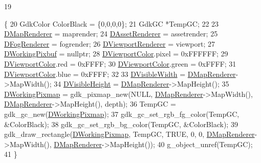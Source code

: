 \begin{DoxyCode}
19                                                                                                            
                                                                                                                  
       \{
20     GdkColor ColorBlack = \{0,0,0,0\};
21     GdkGC *TempGC;
22     
23     \hyperlink{classCMiniMapRenderer_a6656b208c6b29641a151ea4cbcfda31b}{DMapRenderer} = maprender;
24     \hyperlink{classCMiniMapRenderer_a352998f61c6777ccb3969712b8e691d9}{DAssetRenderer} = assetrender;
25     \hyperlink{classCMiniMapRenderer_a51a715ce4773d3fa3f433a282632035c}{DFogRenderer} = fogrender;
26     \hyperlink{classCMiniMapRenderer_a36d2e3446baba2607129c673311d3420}{DViewportRenderer} = viewport;
27     \hyperlink{classCMiniMapRenderer_ad5f723d83a60882a3e82af72e84ff522}{DWorkingPixbuf} = \textcolor{keyword}{nullptr};
28     \hyperlink{classCMiniMapRenderer_a6a4f56052a4ced356448f5f1cc9a465e}{DViewportColor}.pixel = 0xFFFFFF;
29     \hyperlink{classCMiniMapRenderer_a6a4f56052a4ced356448f5f1cc9a465e}{DViewportColor}.red = 0xFFFF;
30     \hyperlink{classCMiniMapRenderer_a6a4f56052a4ced356448f5f1cc9a465e}{DViewportColor}.green = 0xFFFF;
31     \hyperlink{classCMiniMapRenderer_a6a4f56052a4ced356448f5f1cc9a465e}{DViewportColor}.blue = 0xFFFF;
32     
33     \hyperlink{classCMiniMapRenderer_aedcb790a697e6f606cd7fa5089a41359}{DVisibleWidth} = \hyperlink{classCMiniMapRenderer_a6656b208c6b29641a151ea4cbcfda31b}{DMapRenderer}->MapWidth();
34     \hyperlink{classCMiniMapRenderer_aad56353e51a1a3da66d3428cf0f1ccf8}{DVisibleHeight} = \hyperlink{classCMiniMapRenderer_a6656b208c6b29641a151ea4cbcfda31b}{DMapRenderer}->MapHeight();
35     \hyperlink{classCMiniMapRenderer_a53bf622d2048ea136ae256e8d4b81fb5}{DWorkingPixmap} = gdk\_pixmap\_new(NULL, \hyperlink{classCMiniMapRenderer_a6656b208c6b29641a151ea4cbcfda31b}{DMapRenderer}->MapWidth(), 
      \hyperlink{classCMiniMapRenderer_a6656b208c6b29641a151ea4cbcfda31b}{DMapRenderer}->MapHeight(), depth);
36     TempGC = gdk\_gc\_new(\hyperlink{classCMiniMapRenderer_a53bf622d2048ea136ae256e8d4b81fb5}{DWorkingPixmap});
37     gdk\_gc\_set\_rgb\_fg\_color(TempGC, &ColorBlack);
38     gdk\_gc\_set\_rgb\_bg\_color(TempGC, &ColorBlack);
39     gdk\_draw\_rectangle(\hyperlink{classCMiniMapRenderer_a53bf622d2048ea136ae256e8d4b81fb5}{DWorkingPixmap}, TempGC, TRUE, 0, 0, 
      \hyperlink{classCMiniMapRenderer_a6656b208c6b29641a151ea4cbcfda31b}{DMapRenderer}->MapWidth(), \hyperlink{classCMiniMapRenderer_a6656b208c6b29641a151ea4cbcfda31b}{DMapRenderer}->MapHeight());
40     g\_object\_unref(TempGC);
41 \}
\end{DoxyCode}
\hypertarget{classCMiniMapRenderer_a1ae803589192f1d0845e28cdbef19b5a}{}\label{classCMiniMapRenderer_a1ae803589192f1d0845e28cdbef19b5a} 

